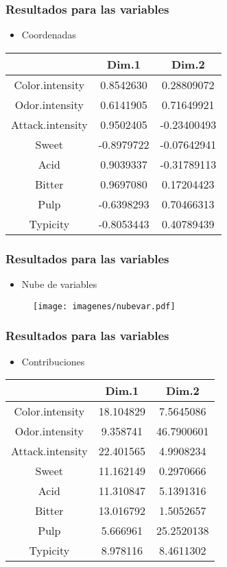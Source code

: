 \documentclass[12pt]{beamer}
\begin{document}
\begin{frame}
\frametitle{Resultados para las variables}
\begin{itemize}
\item Coordenadas
\end{itemize}
\begin{center}
\begin{tabular}{|c|c|c|}
\hline
 & Dim.1  &     Dim.2 \\
\hline
Color.intensity  &  0.8542630 & 0.28809072 \\
Odor.intensity   & 0.6141905 & 0.71649921\\
Attack.intensity & 0.9502405 &-0.23400493\\
Sweet           & -0.8979722 &-0.07642941\\
Acid            &  0.9039337 &-0.31789113\\
Bitter          &  0.9697080 & 0.17204423\\
Pulp            & -0.6398293 & 0.70466313\\
Typicity        & -0.8053443 & 0.40789439\\
\hline
\end{tabular}
\end{center}
\end{frame}

\begin{frame}
\frametitle{Resultados para las variables}
\begin{itemize}
\item Nube de variables
\end{itemize}
\begin{figure}[h]
  \centering
  \texttt{[image: imagenes/nubevar.pdf]}
\end{figure}
\end{frame}

\begin{frame}
\frametitle{Resultados para las variables}
\begin{itemize}
\item Contribuciones
\end{itemize}
\begin{center}
\begin{tabular}{|c|c|c|}
\hline
 & Dim.1  &     Dim.2 \\
\hline
Color.intensity &  18.104829&  7.5645086\\
Odor.intensity  &  9.358741& 46.7900601\\
Attack.intensity& 22.401565&  4.9908234\\
Sweet           & 11.162149&  0.2970666\\
Acid            & 11.310847&  5.1391316\\
Bitter          & 13.016792&  1.5052657\\
Pulp            &  5.666961& 25.2520138\\
Typicity        &  8.978116&  8.4611302\\
\hline
\end{tabular}
\end{center}
\end{frame}
\end{document}
